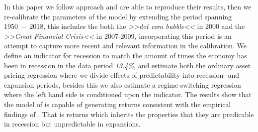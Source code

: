 In this paper we follow \citet{Campbell1999} approach and are able to reproduce their results, then we re-calibrate the parameters of the model by extending the period spanning  $1950 \ -  \ 2018$, this includes the both the \textit{>>dot com bubble<<} in 2000 and the \textit{>>Great Financial Crisis<<} in 2007-2009, incorporating this period is an attempt to capture more recent and relevant information in the calibration. We define an indicator for recession to match the amount of times the economy has been in recession in the data period \textit{13.4\%}, and estimate both the ordinary asset pricing regression where we divide effects of predictability into recession- and expansion periods, besides this we also estimate a regime switching regression where the left hand side is conditioned upon the indicator. 
The results show that the model of \citet{Campbell1999} is capable of generating returns consistent with the empirical findings of \citet{Henkel2011}. That is returns which inherits the properties that they are predicable in recession but unpredictable in expansions.

